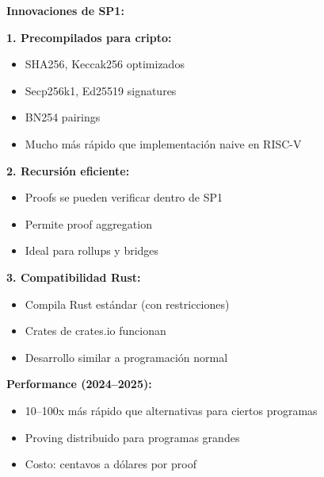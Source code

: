 \documentclass[11pt,a4paper,twoside]{book}
\begin{document}
\begin{mathnote}
\textbf{Innovaciones de SP1:}

\textbf{1. Precompilados para cripto:}
\begin{itemize}
    \item SHA256, Keccak256 optimizados
    \item Secp256k1, Ed25519 signatures
    \item BN254 pairings
    \item Mucho m\'as r\'apido que implementaci\'on naive en RISC-V
\end{itemize}

\textbf{2. Recursi\'on eficiente:}
\begin{itemize}
    \item Proofs se pueden verificar dentro de SP1
    \item Permite proof aggregation
    \item Ideal para rollups y bridges
\end{itemize}

\textbf{3. Compatibilidad Rust:}
\begin{itemize}
    \item Compila Rust est\'andar (con restricciones)
    \item Crates de crates.io funcionan
    \item Desarrollo similar a programaci\'on normal
\end{itemize}

\textbf{Performance (2024--2025):}
\begin{itemize}
    \item 10--100x m\'as r\'apido que alternativas para ciertos programas
    \item Proving distribuido para programas grandes
    \item Costo: centavos a d\'olares por proof
\end{itemize}
\end{mathnote}
\end{document}
